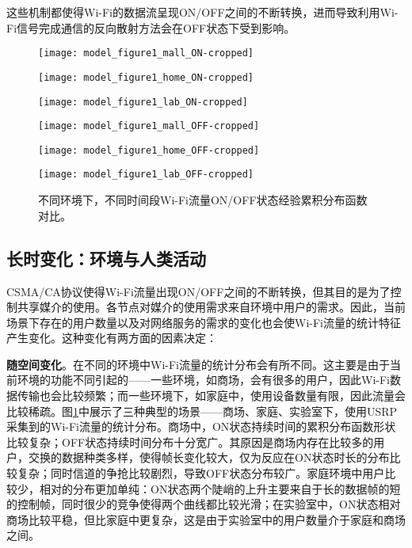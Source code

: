 这些机制都使得Wi-Fi的数据流呈现ON/OFF之间的不断转换，进而导致利用Wi-Fi信号完成通信的反向散射方法会在OFF状态下受到影响。
\begin{figure}
	\begin{minipage}[b]{.32\linewidth}
		\texttt{[image: model\_figure1\_mall\_ON-cropped]}
		\label{fig:ecdf_mall_on}
	\end{minipage}
	\hfill
	\begin{minipage}[b]{.32\linewidth}
		\texttt{[image: model\_figure1\_home\_ON-cropped]}
		\label{fig:ecdf_home_on}
	\end{minipage}
	\hfill
	\begin{minipage}[b]{.32\linewidth}
		\texttt{[image: model\_figure1\_lab\_ON-cropped]}
		\label{fig:ecdf_lab_on}
	\end{minipage}
	
	\begin{minipage}[b]{.32\linewidth}
		\texttt{[image: model\_figure1\_mall\_OFF-cropped]}
		\label{fig:ecdf_mall_off}
	\end{minipage}
	\hfill
	\begin{minipage}[b]{.32\linewidth}
		\texttt{[image: model\_figure1\_home\_OFF-cropped]}
		\label{fig:ecdf_home_off}
	\end{minipage}
	\hfill
	\begin{minipage}[b]{.32\linewidth}
		\texttt{[image: model\_figure1\_lab\_OFF-cropped]}
		\label{fig:ecdf_lab_off}
	\end{minipage}
	\caption{不同环境下，不同时间段Wi-Fi流量ON/OFF状态经验累积分布函数对比。}\label{fig:ecdf}
\end{figure}
\subsection{长时变化：环境与人类活动}
CSMA/CA协议使得Wi-Fi流量出现ON/OFF之间的不断转换，但其目的是为了控制共享媒介的使用。各节点对媒介的使用需求来自环境中用户的需求。因此，当前场景下存在的用户数量以及对网络服务的需求的变化也会使Wi-Fi流量的统计特征产生变化。这种变化有两方面的因素决定：

\textbf{随空间变化}。在不同的环境中Wi-Fi流量的统计分布会有所不同。这主要是由于当前环境的功能不同引起的——一些环境，如商场，会有很多的用户，因此Wi-Fi数据传输也会比较频繁；而一些环境下，如家庭中，使用设备数量有限，因此流量会比较稀疏。图\ref{fig:ecdf}中展示了三种典型的场景——商场、家庭、实验室下，使用USRP采集到的Wi-Fi流量的统计分布。商场中，ON状态持续时间的累积分布函数形状比较复杂；OFF状态持续时间分布十分宽广。其原因是商场内存在比较多的用户，交换的数据种类多样，使得帧长变化较大，仅为反应在ON状态时长的分布比较复杂；同时信道的争抢比较剧烈，导致OFF状态分布较广。家庭环境中用户比较少，相对的分布更加单纯：ON状态两个陡峭的上升主要来自于长的数据帧的短的控制帧，同时很少的竞争使得两个曲线都比较光滑；在实验室中，ON状态相对商场比较平稳，但比家庭中更复杂，这是由于实验室中的用户数量介于家庭和商场之间。

